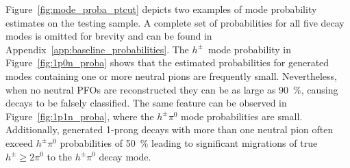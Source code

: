 Figure~\ref{fig:mode_proba_ptcut} depicts two examples of mode probability
estimates on the testing sample. A complete set of probabilities for all five
decay modes is omitted for brevity and can be found in
Appendix~\ref{app:baseline_probabilities}. The $h^\pm$~mode probability in
Figure~\ref{fig:1p0n_proba} shows that the estimated probabilities for generated
modes containing one or more neutral pions are frequently small. Nevertheless,
when no neutral PFOs are reconstructed they can be as large as
\SI{90}{\percent}, causing decays to be falsely classified. The same feature can
be observed in Figure~\ref{fig:1p1n_proba}, where the $h^\pm \pi^0$ mode
probabilities are small. Additionally, generated 1-prong decays with more than
one neutral pion often exceed $h^\pm \pi^0$ probabilities of \SI{50}{\percent}
leading to significant migrations of true $h^\pm \geq 2 \pi^0$ to the
$h^\pm \pi^0$ decay mode.

